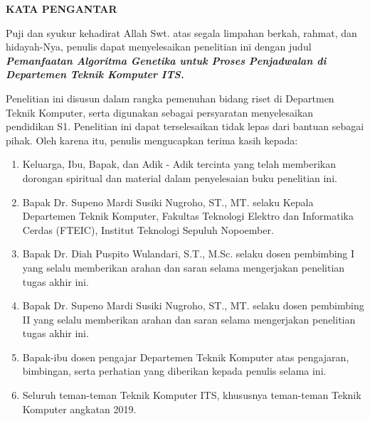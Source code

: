 \begin{center}
  \Large
  \textbf{KATA PENGANTAR}
\end{center}


\vspace{2ex}


Puji dan syukur kehadirat Allah Swt. atas segala limpahan berkah, rahmat, dan hidayah-Nya, penulis dapat menyelesaikan penelitian
ini dengan judul \emph{\textbf{Pemanfaatan Algoritma Genetika untuk Proses Penjadwalan di Departemen Teknik Komputer ITS.}}

Penelitian ini disusun dalam rangka pemenuhan bidang riset di
Departmen Teknik Komputer, serta digunakan sebagai persyaratan
menyelesaikan pendidikan S1. Penelitian ini dapat terselesaikan
tidak lepas dari bantuan sebagai pihak.
Oleh karena itu, penulis mengucapkan terima kasih kepada:

\begin{enumerate}[nolistsep]

  \item Keluarga, Ibu, Bapak, dan Adik - Adik tercinta yang telah
  memberikan dorongan spiritual dan material dalam penyelesaian buku penelitian ini.

  \item Bapak Dr. Supeno Mardi Susiki Nugroho, ST., MT. selaku Kepala Departemen Teknik Komputer, Fakultas Teknologi
  Elektro dan Informatika Cerdas (FTEIC), Institut Teknologi
  Sepuluh Nopoember.

  \item Bapak Dr. Diah Puspito Wulandari, S.T., M.Sc. selaku dosen pembimbing I yang selalu memberikan arahan dan saran
  selama mengerjakan penelitian tugas akhir ini.

  \item Bapak Dr. Supeno Mardi Susiki Nugroho, ST., MT. selaku dosen pembimbing II yang selalu memberikan arahan dan
  saran selama mengerjakan penelitian tugas akhir ini.

  \item Bapak-ibu dosen pengajar Departemen Teknik Komputer atas
  pengajaran, bimbingan, serta perhatian yang diberikan kepada penulis selama ini.

  \item Seluruh teman-teman Teknik Komputer ITS, khususnya teman-teman Teknik Komputer angkatan 2019. 

\end{enumerate}

